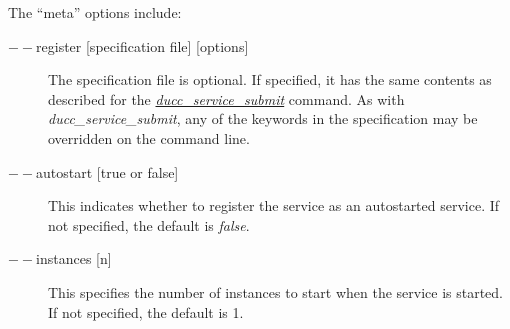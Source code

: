        The ``meta'' options include:
       \begin{description}
           \item[$--$register {[specification file] [options]}] The specification file is optional.  If
             specified, it has the same contents as described for the \hyperref[sec:cli.service-submit]{{\em
                 ducc\_service\_submit}} command.  As with {\em ducc\_service\_submit}, any of the
             keywords in the specification may be overridden on the command line.

           \item[$--$autostart {[true or false]}] This indicates whether to register the service as
             an autostarted service.  If not specified, the default is {\em false}.
             
           \item[$--$instances {[n]}] This specifies the number of instances to start when the service
             is started.  If not specified, the default is 1.
                         
       \end{description}

